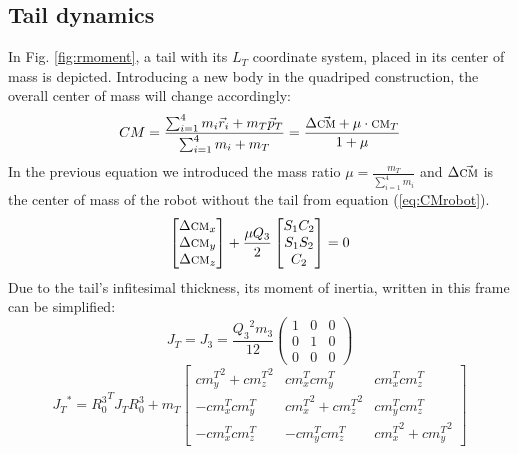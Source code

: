 \subsection{Tail dynamics}
In Fig. \ref{fig:rmoment}, a tail with its ${L_T}$ coordinate system, placed in its center of mass is depicted. Introducing a new body in the quadriped construction, the overall center of mass will change accordingly:
\begin{equation}
CM=\frac{\sum_{i=1}^{4}m_i\vec{r}_i+m_T\vec{p}_T}{\sum_{i=1}^{4}m_i+m_T}= \frac{\Delta\vec{\textsc{cm}}+\mu\cdot\textsc{cm}_T}{1+\mu}
\end{equation}
In the previous equation we introduced the mass ratio $\mu=\frac{m_T}{\sum_{i=1}^{4}m_i}$ and $\Delta\vec{\textsc{cm}}$ is the center of mass of the robot without the tail from equation (\ref{eq:CMrobot}). 
\begin{equation}
\begin{bmatrix}
\Delta \textsc{cm}_x\\ 
\Delta \textsc{cm}_y\\ 
\Delta \textsc{cm}_z
\end{bmatrix}+
\frac{\mu Q_3}{2}\begin{bmatrix}
S_1C_2\\ 
S_1S_2\\ 
C_2
\end{bmatrix}=0
\end{equation}
Due to the tail's infitesimal thickness, its moment of inertia, written in this frame can be simplified:
\begin{equation}
J_T=J_3=\frac{{Q_3}^2 m_3}{12}\left(
\begin{array}{ccc}
 1 & 0 & 0 \\
 0 & 1 & 0 \\
 0 & 0 & 0
\end{array}
\right)
\end{equation} 
\small
\begin{equation}
{J_T}^*={R_0^3}^TJ_TR_0^3+m_T\begin{bmatrix}
{cm_y^T}^2 +{cm_z^T}^2& {cm_x^T}{cm_y^T}& {cm_x^T}{cm_z^T} \\ 
-{cm_x^T}{cm_y^T} & {cm_x^T}^2+{cm_z^T}^2 & {cm_y^T}{cm_z^T}\\ 
-{cm_x^T}{cm_z^T} & -{cm_y^T}{cm_z^T} & {cm_x^T}^2+{cm_y^T}^2
\end{bmatrix}
\end{equation}
\normalsize


